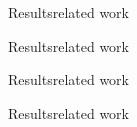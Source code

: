 \begin{frame}{Results}{related work}
\end{frame}



\begin{frame}{Results}{related work}
\end{frame}



\begin{frame}{Results}{related work}
\end{frame}



\begin{frame}{Results}{related work}
\end{frame}





